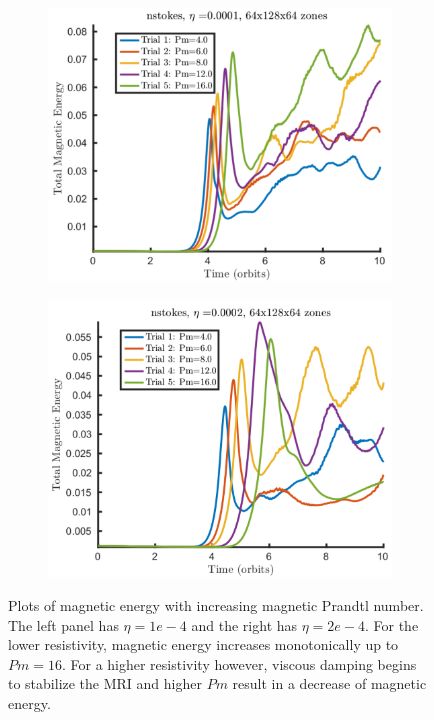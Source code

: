 \begin{figure}[h]
  \begin{subfigure}{.5\textwidth}
    \begin{center}
      \includegraphics [width=\textwidth, angle=0.]{img/nstokes-eta1R1L1_MExyz_TE-0.pdf}
    \end{center}
  \end{subfigure}
  \begin{subfigure}{.5\textwidth}
    \begin{center}
      \includegraphics [width=\textwidth, angle=0.]{img/nstokes-eta2R1L1_MExyz_TE-0.pdf}
    \end{center}
  \end{subfigure}
  \caption{Plots of magnetic energy with increasing magnetic Prandtl number. The left panel has $\eta=1e-4$ and the right has $\eta=2e-4$. For the lower resistivity, magnetic energy increases monotonically up to $Pm=16$. For a higher resistivity however, viscous damping begins to stabilize the MRI and higher $Pm$ result in a decrease of  magnetic energy.}
  \label{fig:nstokesPm}
\end{figure}
